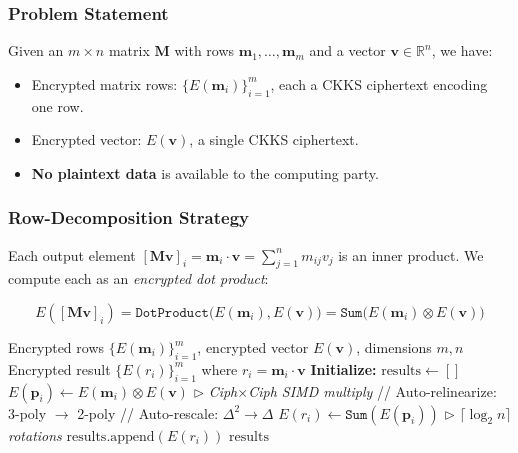 \documentclass[conference,12pt]{IEEEtran}
\begin{document}
\subsubsection{Problem Statement}
Given an $m \times n$ matrix $\mathbf{M}$ with rows $\mathbf{m}_1, \ldots, \mathbf{m}_m$ and a vector $\mathbf{v} \in \mathbb{R}^n$, we have:
\begin{itemize}
    \item Encrypted matrix rows: $\{E(\mathbf{m}_i)\}_{i=1}^{m}$, each a CKKS ciphertext encoding one row.
    \item Encrypted vector: $E(\mathbf{v})$, a single CKKS ciphertext.
    \item \textbf{No plaintext data} is available to the computing party.
\end{itemize}

\subsubsection{Row-Decomposition Strategy}
Each output element $[\mathbf{Mv}]_i = \mathbf{m}_i \cdot \mathbf{v} = \sum_{j=1}^{n} m_{ij} v_j$ is an inner product. We compute each as an \emph{encrypted dot product}:

\begin{equation}
    E([\mathbf{Mv}]_i) = \texttt{DotProduct}\big(E(\mathbf{m}_i), E(\mathbf{v})\big) = \texttt{Sum}\big(E(\mathbf{m}_i) \otimes E(\mathbf{v})\big)
    \label{eq:fhe_matvec}
\end{equation}

\begin{algorithm}[htbp]
\caption{FHE-MVM: Fully Homomorphic Matrix--Vector Multiply}
\label{alg:fhe_matvec}
\begin{algorithmic}[1]
\REQUIRE Encrypted rows $\{E(\mathbf{m}_i)\}_{i=1}^{m}$, encrypted vector $E(\mathbf{v})$, dimensions $m, n$
\ENSURE Encrypted result $\{E(r_i)\}_{i=1}^{m}$ where $r_i = \mathbf{m}_i \cdot \mathbf{v}$
\STATE \textbf{Initialize:} $\text{results} \leftarrow []$
    \STATE $E(\mathbf{p}_i) \leftarrow E(\mathbf{m}_i) \otimes E(\mathbf{v})$ \hfill $\triangleright$ \textit{Ciph$\times$Ciph SIMD multiply}
    \STATE // Auto-relinearize: 3-poly $\to$ 2-poly
    \STATE // Auto-rescale: $\Delta^2 \to \Delta$
    \STATE $E(r_i) \leftarrow \texttt{Sum}(E(\mathbf{p}_i))$ \hfill $\triangleright$ \textit{$\lceil \log_2 n \rceil$ rotations}
    \STATE $\text{results}.\text{append}(E(r_i))$
\ENDFOR
\RETURN $\text{results}$
\end{algorithmic}
\end{algorithm}
\end{document}
